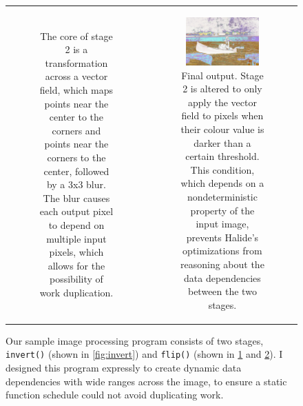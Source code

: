 \documentclass{article}
\begin{document}
\begin{figure}[t]
\begin{tabular}{cc}
\begin{subfigure}[b]{0.45\textwidth}
\begin{center}
		\end{center}
		\caption{The core of stage 2 is a transformation across a vector field, which maps points near the center to the corners and points near the corners to the center, followed by a 3x3 blur. The blur causes each output pixel to depend on multiple input pixels, which allows for the possibility of work duplication.}
		\label{fig:flip-blur-1}
	\end{subfigure} &
	\begin{subfigure}[b]{0.45\textwidth}
		\begin{center}
		\includegraphics[width=0.85\textwidth]{canoe-3.png}
		\end{center}
		\caption{Final output. Stage 2 is altered to only apply the vector field to pixels when their colour value is darker than a certain threshold. This condition, which depends on a nondeterministic property of the input image, prevents Halide's optimizations from reasoning about the data dependencies between the two stages.}
		\label{fig:flip-blur-2}
	\end{subfigure}
	\end{tabular}
	\caption{Our sample image processing program consists of two stages, \texttt{invert()} (shown in \ref{fig:invert}) and \texttt{flip()} (shown in \ref{fig:flip-blur-1} and \ref{fig:flip-blur-2}). I designed this program expressly to create dynamic data dependencies with wide ranges across the image, to ensure a static function schedule could not avoid duplicating work.}

	\label{fig:flip}
\end{figure}
\end{document}
